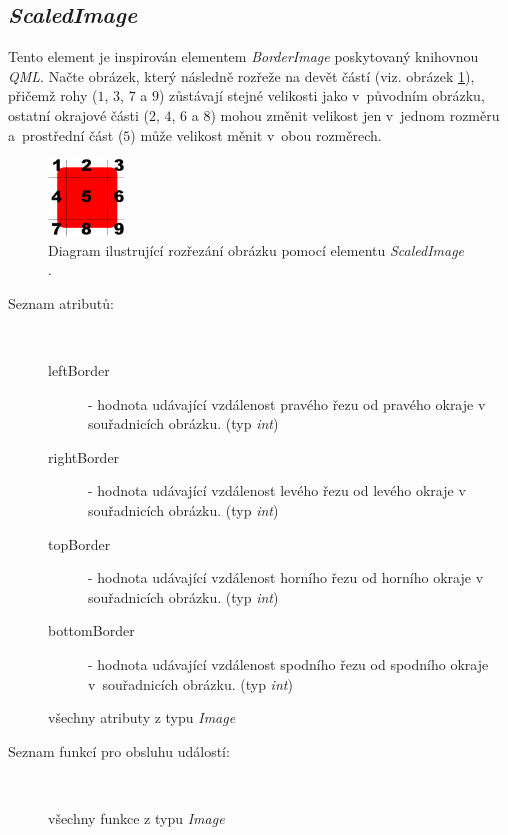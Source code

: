 \documentclass[11pt,twoside,a4paper]{book}
\begin{document}
\subsection{\label{SEC:scaled}\textit{ScaledImage}}
Tento element je inspirován elementem \textit{BorderImage} poskytovaný knihovnou \textit{QML}. Načte obrázek, který následně rozřeže na devět částí (viz. obrázek \ref{fig:cut}), přičemž rohy ($1$, $3$, $7$ a $9$) zůstávají stejné velikosti jako v~původním obrázku, ostatní okrajové části ($2$, $4$, $6$ a $8$) mohou změnit velikost jen v~jednom rozměru a~prostřední část ($5$) může velikost měnit v~obou rozměrech.\\
\begin{figure}[!ht]
\begin{center}
  \includegraphics[width=0.18\textwidth]{figures/imgCut}
\caption{{\label{fig:cut}}Diagram ilustrující rozřezání obrázku pomocí elementu \textit{ScaledImage} \cite{bib:borderedImage}.}
\end{center}
\end{figure}
\begin{description}
\item[Seznam atributů:] ~
\begin{description}
\item[leftBorder] - hodnota udávající vzdálenost pravého řezu od pravého okraje v souřadnicích obrázku. (typ \textit{int})
\item[rightBorder] - hodnota udávající vzdálenost levého řezu od levého okraje v souřadnicích obrázku. (typ \textit{int})
\item[topBorder] - hodnota udávající vzdálenost horního řezu od horního okraje v souřadnicích obrázku. (typ \textit{int})
\item[bottomBorder] - hodnota udávající vzdálenost spodního řezu od spodního okraje v~souřadnicích obrázku. (typ \textit{int})
\item[všechny atributy z typu \textit{Image}]
\end{description}
\item[Seznam funkcí pro obsluhu událostí:] ~
\begin{description}
\item[všechny funkce z typu \textit{Image}]
\end{description}
\end{description}
\end{document}
